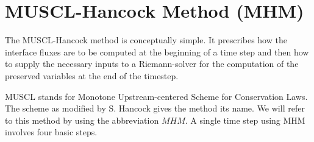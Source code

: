 \documentclass[10pt,letterpaper,notitlepage]{article}
\numberwithin{equation}{section}
\newcommand{\partialderiv}[2]{\frac{\partial #1}{\partial #2}}
\newcommand{\dotp}{\boldsymbol{\cdot}}
\newcommand{\uvec}[1]{\boldsymbol{\hat{\textbf{#1}}}}
\newcommand{\ihat}{\uvec{\i}}
\newcommand{\beqn}{\begin{equation}\begin{aligned}}
\newcommand{\eeqn}{\end{aligned}\end{equation}}
\begin{document}


\vspace{1cm}
\section{MUSCL-Hancock Method (MHM)} \label{section:MHM}
The MUSCL-Hancock method is conceptually simple. It prescribes how the interface fluxes are to be computed at the beginning of a time step and then how to supply the necessary inputs to a Riemann-solver for the computation of the preserved variables at the end of the timestep.

MUSCL stands for Monotone Upstream-centered Scheme for Conservation Laws. The scheme as modified by S. Hancock gives the method its name. We will refer to this method by using the abbreviation $MHM$.
\newline
\newline
\noindent
A single time step using MHM involves four basic steps.
\end{document}

